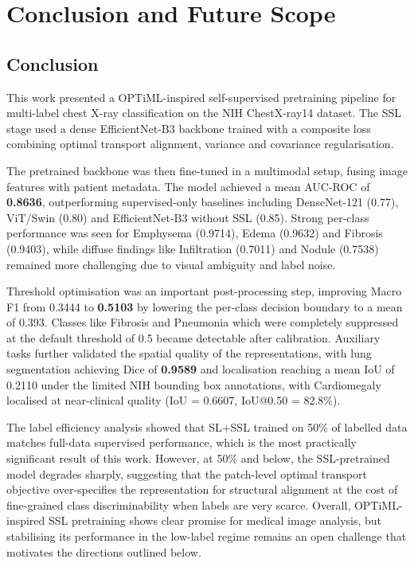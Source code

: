 
\chapter{Conclusion and Future Scope}
\label{chap:conclusion}

\section{Conclusion}
\label{sec:conclusion}

This work presented a OPTiML-inspired self-supervised pretraining pipeline for multi-label chest X-ray classification on the NIH ChestX-ray14 dataset. The SSL stage used a dense EfficientNet-B3 backbone trained with a composite loss combining optimal transport alignment, variance and covariance regularisation.

The pretrained backbone was then fine-tuned in a multimodal setup, fusing image features with patient metadata. The model achieved a mean AUC-ROC of \textbf{0.8636}, outperforming supervised-only baselines including DenseNet-121 (0.77), ViT/Swin (0.80) and EfficientNet-B3 without SSL (0.85). Strong per-class performance was seen for Emphysema (0.9714), Edema (0.9632) and Fibrosis (0.9403), while diffuse findings like Infiltration (0.7011) and Nodule (0.7538) remained more challenging due to visual ambiguity and label noise.

Threshold optimisation was an important post-processing step, improving Macro F1 from 0.3444 to \textbf{0.5103} by lowering the per-class decision boundary to a mean of 0.393. Classes like Fibrosis and Pneumonia which were completely suppressed at the default threshold of 0.5 became detectable after calibration. Auxiliary tasks further validated the spatial quality of the representations, with lung segmentation achieving Dice of \textbf{0.9589} and localisation reaching a mean IoU of 0.2110 under the limited NIH bounding box annotations, with Cardiomegaly localised at near-clinical quality (IoU = 0.6607, IoU@0.50 = 82.8\%).

The label efficiency analysis showed that SL+SSL trained on 50\% of labelled data matches full-data supervised performance, which is the most practically significant result of this work. However, at 50\% and below, the SSL-pretrained model degrades sharply, suggesting that the patch-level optimal transport objective over-specifies the representation for structural alignment at the cost of fine-grained class discriminability when labels are very scarce. Overall, OPTiML-inspired SSL pretraining shows clear promise for medical image analysis, but stabilising its performance in the low-label regime remains an open challenge that motivates the directions outlined below.

